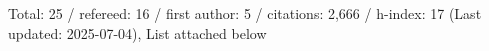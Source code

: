 Total: 25 / refereed: 16 / first author: 5 / citations: 2,666 / h-index: 17 (Last updated: 2025-07-04), List attached below